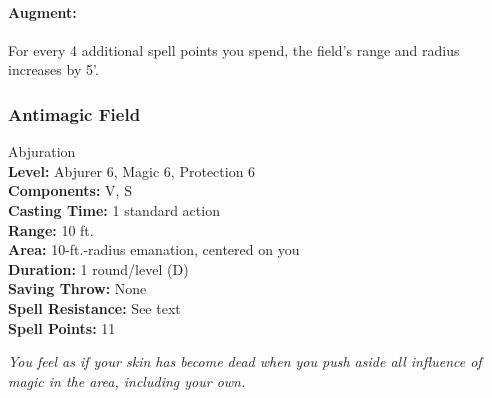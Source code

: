 \paragraph{Augment:} For every 4 additional spell points you spend, the field's range and radius increases by 5'.
\subsubsection{Antimagic Field}
\label{Spell:AntimagicField}
Abjuration
\\ \textbf{Level:} Abjurer 6, Magic 6, Protection 6
\\ \textbf{Components:} V, S
\\ \textbf{Casting Time:} 1 standard action
\\ \textbf{Range:} 10 ft.
\\ \textbf{Area:} 10-ft.-radius emanation, centered on you
\\ \textbf{Duration:} 1 round/level (D)
\\ \textbf{Saving Throw:} None
\\ \textbf{Spell Resistance:} See text
\\ \textbf{Spell Points:} 11

\emph{You feel as if your skin has become dead when you push aside all influence of magic in the area, including your own.}

